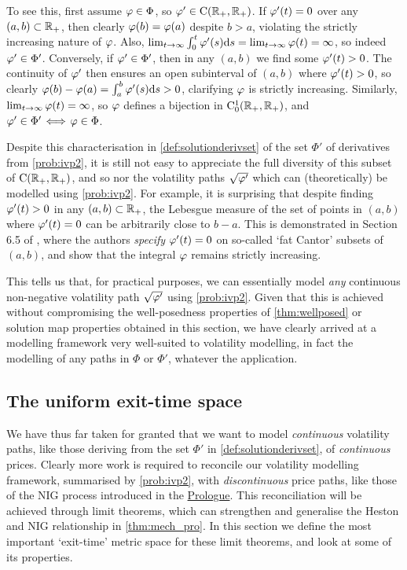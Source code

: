 To see this, first assume $\varphi\in\Phi$, so $\varphi'\in\mathrm{C}(\mathbb{R}_+,\mathbb{R}_+)$. If $\varphi'(t)=0$ over any $(a,b)\subset\mathbb{R}_+$, then clearly $\varphi(b)=\varphi(a)$ despite $b>a$, violating the strictly increasing nature of $\varphi$. Also, $\lim_{t\to\infty}\int_0^t\varphi'(s)\mathrm{d} s = \lim_{t\to\infty}\varphi(t)= \infty$, so indeed $\varphi'\in\Phi'$. Conversely, if $\varphi'\in\Phi'$, then in any $(a,b)$ we find some $\varphi'(t)>0$. The continuity of $\varphi'$ then ensures an open subinterval of $(a,b)$ where $\varphi'(t)>0$, so clearly $\varphi(b)-\varphi(a)= \int_a^b\varphi'(s)\mathrm{d} s>0$, clarifying $\varphi$ is strictly increasing. Similarly, $\lim_{t\to\infty}\varphi(t)=\infty$, so $\varphi$ defines a bijection in $\mathrm{C}_0^1(\mathbb{R}_+,\mathbb{R}_+)$, and $\varphi'\in\Phi'\!\iff\!\varphi\in\Phi$.

Despite this characterisation in \autoref{def:solutionderivset} of the set $\Phi'$ of derivatives from \autoref{prob:ivp2}, it is still not easy to appreciate the full diversity of this subset of $\mathrm{C}(\mathbb{R}_+,\mathbb{R}_+)$, and so nor the volatility paths $\sqrt{\varphi'}$ which can (theoretically) be modelled using \autoref{prob:ivp2}. For example, it is surprising that despite finding $\varphi'(t)>0$ in any $(a,b)\subset\mathbb{R}_+$, the Lebesgue measure of the set of points in $(a,b)$ where $\varphi'(t)=0$ can be arbitrarily close to $b-a$. This is demonstrated in Section 6.5 of \cite{royden_2010}, where the authors \emph{specify} $\varphi'(t)=0$ on so-called `fat Cantor' subsets of $(a,b)$, and show that the integral $\varphi$ remains strictly increasing.

This tells us that, for practical purposes, we can essentially model \emph{any} continuous non-negative volatility path $\sqrt{\varphi'}$ using \autoref{prob:ivp2}. Given that this is achieved without compromising the well-posedness properties of \autoref{thm:wellposed} or solution map properties obtained in this section, we have clearly arrived at a modelling framework very well-suited to volatility modelling, in fact the modelling of any paths in $\Phi$ or $\Phi'$, whatever the application.

\subsection{The uniform exit-time space} \label{sec:exit_topology}

We have thus far taken for granted that we want to model \emph{continuous} volatility paths, like those deriving from the set $\Phi'$ in \autoref{def:solutionderivset}, of \emph{continuous} prices. Clearly more work is required to reconcile our volatility modelling framework, summarised by \autoref{prob:ivp2}, with \emph{discontinuous} price paths, like those of the NIG process introduced in the \hyperlink{prologue}{Prologue}. This reconciliation will be achieved through limit theorems, which can strengthen and generalise the Heston and NIG relationship in \autoref{thm:mech_pro}. In this section we define the most important `exit-time' metric space for these limit theorems, and look at some of its properties.

